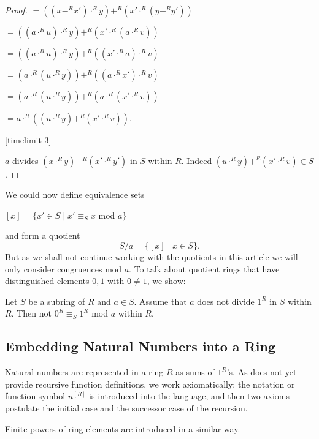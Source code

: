 \documentclass[english,11pt]{article}
\begin{document}
\begin{forthel}
\begin{proof}
$ = ((x -^{R} x') \cdot^{R} y) +^{R} (x' \cdot^{R} (y -^{R} y'))$

$ = ((a \cdot^{R} u) \cdot^{R} y) +^{R} (x' \cdot^{R} (a \cdot^{R} v))$

$ = ((a \cdot^{R} u) \cdot^{R} y) +^{R} ((x' \cdot^{R} a) \cdot^{R} v)$

$ = (a \cdot^{R} (u \cdot^{R} y)) +^{R} ((a \cdot^{R} x') \cdot^{R} v)$

$ = (a \cdot^{R} (u \cdot^{R} y)) +^{R} (a \cdot^{R} (x' \cdot^{R} v))$

$ = a \cdot^{R} ((u \cdot^{R} y) +^{R} (x' \cdot^{R} v))$.

[timelimit 3]

$a$ divides $(x \cdot^{R} y) -^{R} (x' \cdot^{R} y')$
in $S$ within $R$. Indeed
$(u \cdot^{R} y) +^{R} (x' \cdot^{R} v) \in S$.
\end{proof}

\end{forthel}
We could now define equivalence sets 

$[x]=\{x' \in S \mid x' \equiv_{S} x $ mod $a\}$

\noindent and form a quotient
\[S/a = \{[x]\mid x \in S\}.\]
But as we shall not continue working with the quotients in this article
we will only consider congruences mod $a$. To talk about 
quotient rings that have distinguished elements $0,1$ with 
$0 \neq 1$, we show:
\begin{forthel}
\begin{lemma}
Let $S$ be a subring of $R$ and $a \in S$.
Assume that $a$ does not divide $1^{R}$ in $S$ within $R$.
Then not $0^{R} \equiv_{S} 1^{R}$ mod $a$ within $R$.
\end{lemma}


\end{forthel}

\subsection{Embedding Natural Numbers into a Ring}

Natural numbers are represented in a ring $R$ as sums of $1^{R}$'s.
As \Naproche does not yet provide recursive function definitions,
we work axiomatically: the notation or function symbol $n^{[R]}$ is
introduced into the language, and then two axioms postulate the initial case
and the successor case of the recursion.

Finite powers of ring elements are introduced in a similar way.
\end{document}
